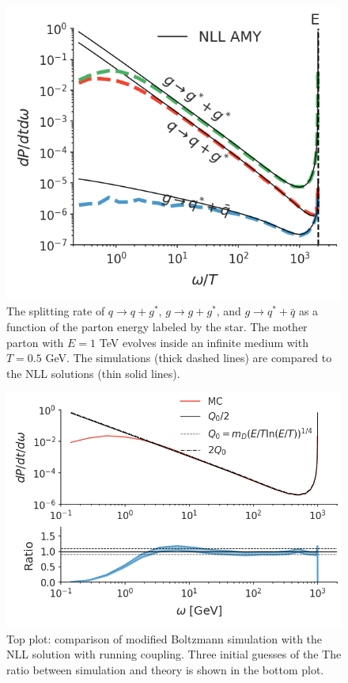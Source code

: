 \documentclass[aps, prc, reprint, amsmath, groupedaddress, nofootinbib]{revtex4-1}
\begin{document}
\begin{figure}
\includegraphics[width=\columnwidth]{channel_rate.png}
\caption{The splitting rate of $q\rightarrow q+g^*$, $g\rightarrow g+g^*$, and $g\rightarrow q^* + \bar{q}$ as a function of the parton energy labeled by the star. The mother parton with $E=1$ TeV evolves inside an infinite medium with $T=0.5$ GeV. The simulations (thick dashed lines) are compared to the NLL solutions (thin solid lines).}
\label{fig:channel_rate}
\end{figure}

\begin{figure}
\includegraphics[width=\columnwidth]{running.png}
\caption{Top plot: comparison of modified Boltzmann simulation with the NLL solution  with running coupling.
Three initial guesses of the 
The ratio between simulation and theory is shown in the bottom plot.}
\label{fig:running}
\end{figure}
\end{document}
